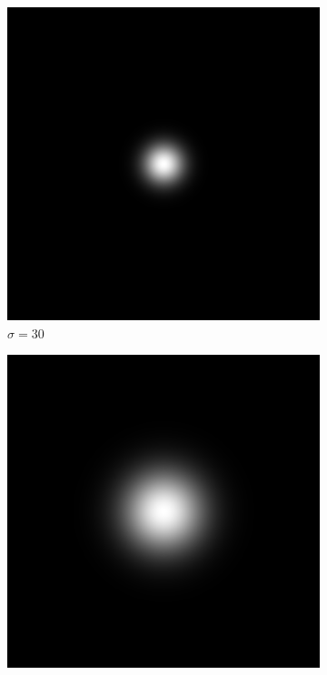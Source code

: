 \documentclass[
	12pt, %
]{style/fphw}
\begin{document}
\begin{figure}[H]
    \centering
     \begin{subfigure}[b]{.3\textwidth}
         \centering
         \includegraphics[width=\textwidth]{Q5_2_lowpass_filter_30.png}
         \caption{$\sigma=30$}
         \label{Q5_2_lowpass_filter_30}
     \end{subfigure}
     \hfill
     \begin{subfigure}[b]{.3\textwidth}
         \centering
         \includegraphics[width=\textwidth]{Q5_2_lowpass_filter_60.png}

\end{subfigure}
\end{figure}
\end{document}

